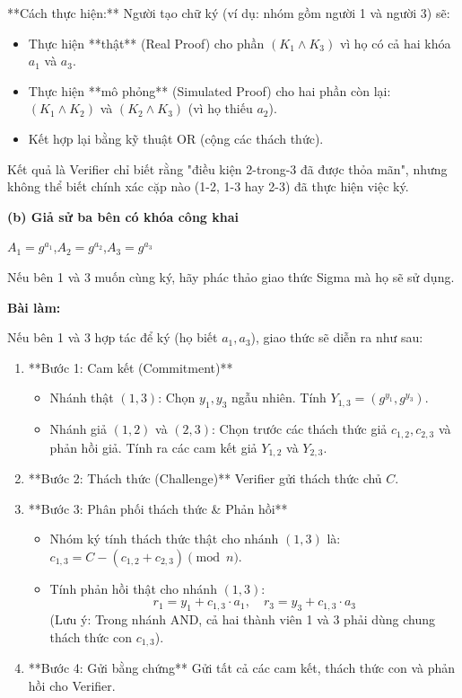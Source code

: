 **Cách thực hiện:**
Người tạo chữ ký (ví dụ: nhóm gồm người 1 và người 3) sẽ:
\begin{itemize}
    \item Thực hiện **thật** (Real Proof) cho phần $(K_1 \land K_3)$ vì họ có cả hai khóa $a_1$ và $a_3$.
    \item Thực hiện **mô phỏng** (Simulated Proof) cho hai phần còn lại: $(K_1 \land K_2)$ và $(K_2 \land K_3)$ (vì họ thiếu $a_2$).
    \item Kết hợp lại bằng kỹ thuật OR (cộng các thách thức).
\end{itemize}
Kết quả là Verifier chỉ biết rằng "điều kiện 2-trong-3 đã được thỏa mãn", nhưng không thể biết chính xác cặp nào (1-2, 1-3 hay 2-3) đã thực hiện việc ký.

\textbf{(b) Giả sử ba bên có khóa công khai}

$A_1 = g^{a_1}$,\quad $A_2 = g^{a_2}$,\quad $A_3 = g^{a_3}$

Nếu bên 1 và 3 muốn cùng ký, hãy phác thảo giao thức Sigma mà họ sẽ sử dụng.

\textbf{Bài làm:}

Nếu bên 1 và 3 hợp tác để ký (họ biết $a_1, a_3$), giao thức sẽ diễn ra như sau:

\begin{enumerate}
    \item **Bước 1: Cam kết (Commitment)**
    \begin{itemize}
        \item Nhánh thật $(1,3)$: Chọn $y_1, y_3$ ngẫu nhiên. Tính $Y_{1,3} = (g^{y_1}, g^{y_3})$.
        \item Nhánh giả $(1,2)$ và $(2,3)$: Chọn trước các thách thức giả $c_{1,2}, c_{2,3}$ và phản hồi giả. Tính ra các cam kết giả $Y_{1,2}$ và $Y_{2,3}$.
    \end{itemize}
    
    \item **Bước 2: Thách thức (Challenge)**
    Verifier gửi thách thức chủ $C$.
    
    \item **Bước 3: Phân phối thách thức \& Phản hồi**
    \begin{itemize}
        \item Nhóm ký tính thách thức thật cho nhánh $(1,3)$ là: $c_{1,3} = C - (c_{1,2} + c_{2,3}) \pmod{n}$.
        \item Tính phản hồi thật cho nhánh $(1,3)$:
        \[
        r_1 = y_1 + c_{1,3} \cdot a_1, \quad r_3 = y_3 + c_{1,3} \cdot a_3
        \]
        (Lưu ý: Trong nhánh AND, cả hai thành viên 1 và 3 phải dùng chung thách thức con $c_{1,3}$).
    \end{itemize}
    
    \item **Bước 4: Gửi bằng chứng**
    Gửi tất cả các cam kết, thách thức con và phản hồi cho Verifier.
\end{enumerate}


